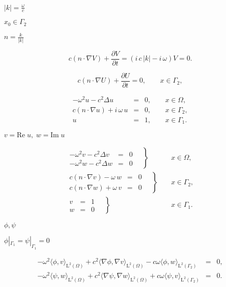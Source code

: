 \documentclass{article}
\begin{document}
$|k|={\frac{\omega}{c}}$
\pagebreak

$x_0\in\Gamma_2$
\pagebreak

$n=\frac{k}{|k|}$
\pagebreak

\[ c (n\cdot\nabla V) + \frac{\partial V}{\partial t} = (i\, c\, |k| - i\, \omega) V = 0. \]
\pagebreak

\[ c (n\cdot\nabla U) + \frac{\partial U}{\partial t} = 0, \qquad x\in\Gamma_2, \]
\pagebreak

\begin{eqnarray*} -\omega^2 u - c^2\Delta u &=& 0, \qquad x\in\Omega,\\ c (n\cdot\nabla u) + i\,\omega\,u &=&0, \qquad x\in\Gamma_2,\\ u &=& 1, \qquad x\in\Gamma_1. \end{eqnarray*}
\pagebreak

$v=\textrm{Re}\;u,\; w=\textrm{Im}\;u$
\pagebreak

\begin{eqnarray*} \left.\begin{array}{ccc} -\omega^2 v - c^2\Delta v &=& 0 \quad\\ -\omega^2 w - c^2\Delta w &=& 0 \quad \end{array}\right\} &\;& x\in\Omega, \\ \left.\begin{array}{ccc} c (n\cdot\nabla v) - \omega\,w &=& 0 \quad\\ c (n\cdot\nabla w) + \omega\,v &=& 0 \quad \end{array}\right\} &\;& x\in\Gamma_2, \\ \left.\begin{array}{ccc} v &=& 1 \quad\\ w &=& 0 \quad \end{array}\right\} &\;& x\in\Gamma_1. \end{eqnarray*}
\pagebreak

$\phi,\psi$
\pagebreak

$\phi|_{\Gamma_1}=\psi|_{\Gamma_1}=0$
\pagebreak

\begin{eqnarray*} -\omega^2 \langle \phi, v \rangle_{\mathrm{L}^2(\Omega)} + c^2 \langle \nabla \phi, \nabla v \rangle_{\mathrm{L}^2(\Omega)} - c \omega \langle \phi, w \rangle_{\mathrm{L}^2(\Gamma_2)} &=& 0, \\ -\omega^2 \langle \psi, w \rangle_{\mathrm{L}^2(\Omega)} + c^2 \langle \nabla \psi, \nabla w \rangle_{\mathrm{L}^2(\Omega)} + c \omega \langle \psi, v \rangle_{\mathrm{L}^2(\Gamma_2)} &=& 0. \end{eqnarray*}
\pagebreak
\end{document}
